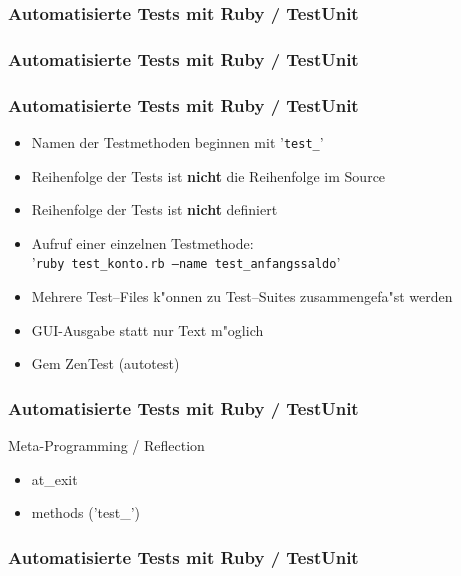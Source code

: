 \documentclass{beamer}
\begin{document}
\begin{frame}[containsverbatim]
  \frametitle{Automatisierte Tests mit Ruby / TestUnit}

\end{frame}

\begin{frame}[containsverbatim]
  \frametitle{Automatisierte Tests mit Ruby / TestUnit}
%
\end{frame}

\begin{frame}
  \frametitle{Automatisierte Tests mit Ruby / TestUnit}
  \begin{itemize}
    \item Namen der Testmethoden beginnen mit '\texttt{test\_}'
    \item Reihenfolge der Tests ist {\bf nicht} die Reihenfolge im Source
    \item Reihenfolge der Tests ist {\bf nicht} definiert
    \item Aufruf einer einzelnen Testmethode:\\ '\texttt{ruby test\_konto.rb --name test\_anfangssaldo}'
    \item Mehrere Test--Files k"onnen zu Test--Suites zusammengefa"st werden
    \item GUI-Ausgabe statt nur Text m"oglich
    \item Gem ZenTest (autotest)
  \end{itemize}
\end{frame}

\begin{frame}
  \frametitle{Automatisierte Tests mit Ruby / TestUnit}
  Meta-Programming / Reflection
  \begin{itemize}
    \item at\_exit
    \item methods ('test\_')
  \end{itemize}
\end{frame}

\begin{frame}[containsverbatim]
  \frametitle{Automatisierte Tests mit Ruby / TestUnit}
  
\end{frame}
\end{document}
